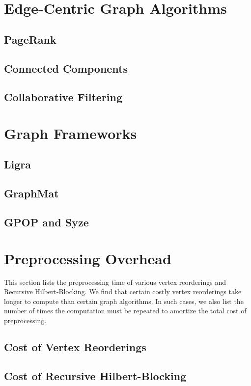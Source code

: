 \section{Edge-Centric Graph Algorithms}\label{sec:ec-algos}
\subsection{PageRank}
\subsection{Connected Components}
\subsection{Collaborative Filtering}
\section{Graph Frameworks}\label{sec:ggps}
\subsection{Ligra}
\subsection{GraphMat}
\subsection{GPOP and Syze}

\section{Preprocessing Overhead}\label{sec:preproc}
This section lists the preprocessing time of various vertex reorderings 
and Recursive Hilbert-Blocking. We find that certain costly vertex reorderings take longer to compute than certain graph algorithms. In such cases, we also list the number of times the computation must be repeated to amortize the total cost of preprocessing.

\subsection{Cost of Vertex Reorderings}
\subsection{Cost of Recursive Hilbert-Blocking}
